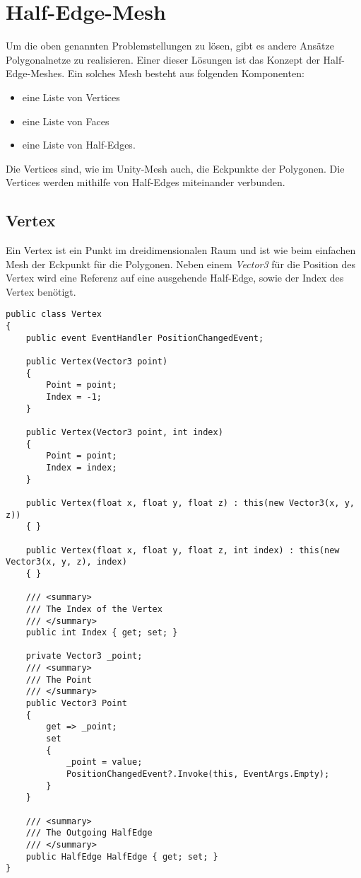\section{Half-Edge-Mesh}
Um die oben genannten Problemstellungen zu l\"osen, gibt es andere Ans\"atze Polygonalnetze zu realisieren. Einer dieser L\"osungen ist das Konzept der Half-Edge-Meshes. Ein solches Mesh besteht aus folgenden Komponenten: 
\begin{itemize}
	\item eine Liste von Vertices
	\item eine Liste von Faces
	\item eine Liste von Half-Edges.
\end{itemize}

Die Vertices sind, wie im Unity-Mesh auch, die Eckpunkte der Polygonen. Die Vertices werden mithilfe von Half-Edges miteinander verbunden. 

\subsection{Vertex}
Ein Vertex ist ein Punkt im dreidimensionalen Raum und ist wie beim einfachen Mesh der Eckpunkt f\"ur die Polygonen. Neben einem \textit{Vector3} f\"ur die Position des Vertex wird eine Referenz auf eine ausgehende Half-Edge, sowie der Index des Vertex ben\"otigt.
\\
\begin{lstlisting}
public class Vertex
{
	public event EventHandler PositionChangedEvent;
	
	public Vertex(Vector3 point)
	{
		Point = point;
		Index = -1;
	}

	public Vertex(Vector3 point, int index)
	{
		Point = point;
		Index = index;
	}

	public Vertex(float x, float y, float z) : this(new Vector3(x, y, z))
	{ }

	public Vertex(float x, float y, float z, int index) : this(new Vector3(x, y, z), index)
	{ }

	/// <summary>
	/// The Index of the Vertex
	/// </summary>
	public int Index { get; set; }

	private Vector3 _point;
	/// <summary>
	/// The Point
	/// </summary>
	public Vector3 Point
	{
		get => _point;
		set
		{
			_point = value;
			PositionChangedEvent?.Invoke(this, EventArgs.Empty);
		}
	}

	/// <summary>
	/// The Outgoing HalfEdge
	/// </summary>
	public HalfEdge HalfEdge { get; set; }
}
\end{lstlisting}

